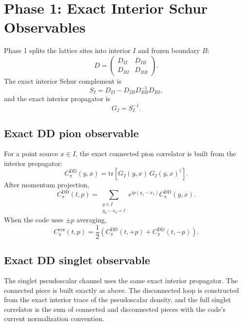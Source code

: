 \documentclass[11pt]{article}
\begin{document}
\section{Phase 1: Exact Interior Schur Observables}
Phase 1 splits the lattice sites into interior $I$ and frozen boundary $B$:
\begin{equation}
D =
\begin{pmatrix}
D_{II} & D_{IB} \\
D_{BI} & D_{BB}
\end{pmatrix}.
\end{equation}
The exact interior Schur complement is
\begin{equation}
S_I = D_{II} - D_{IB} D_{BB}^{-1} D_{BI},
\end{equation}
and the exact interior propagator is
\begin{equation}
G_I = S_I^{-1}.
\end{equation}

\subsection{Exact DD pion observable}
For a point source $x \in I$, the exact connected pion correlator is built from
the interior propagator:
\begin{equation}
C_\pi^{\mathrm{DD}}(y,x)
=
\mathrm{tr}\!\left[
G_I(y,x)\,G_I(y,x)^\dagger
\right].
\end{equation}
After momentum projection,
\begin{equation}
C_\pi^{\mathrm{DD}}(t,p)
=
\sum_{\substack{y \in I\\ y_0-x_0=t}}
e^{ip(y_1-x_1)} C_\pi^{\mathrm{DD}}(y,x).
\end{equation}
When the code uses $\pm p$ averaging,
\begin{equation}
C_\pi^{\cos}(t,p)
=
\frac12\left(C_\pi^{\mathrm{DD}}(t,+p)+C_\pi^{\mathrm{DD}}(t,-p)\right).
\end{equation}

\subsection{Exact DD singlet observable}
The singlet pseudoscalar channel uses the same exact interior propagator. The connected
piece is built exactly as above. The disconnected loop is constructed from the exact
interior trace of the pseudoscalar density, and the full singlet correlator is the
sum of connected and disconnected pieces with the code's current normalization convention.
\end{document}
